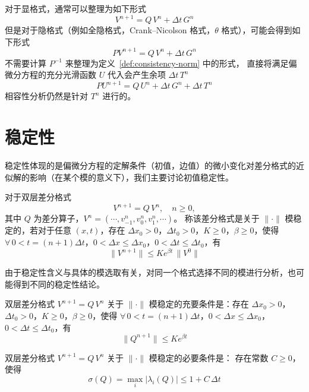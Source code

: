 \begin{remark}
    对于显格式，通常可以整理为如下形式
    \[
        V^{n+1} = Q \, V^{n} + \Delta t\, G^{n}
    \]
    但是对于隐格式（例如全隐格式，Crank–Nicolson 格式，$\theta$ 格式），可能会得到如下形式
    \[
        P V^{n+1} = Q \, V^{n} + \Delta t\, G^{n}
    \]
    不需要计算 $P^{-1}$ 来整理为定义~\ref{def:consistency-norm} 中的形式，
    直接将满足偏微分方程的充分光滑函数 $U$ 代入会产生余项 $\Delta t\,T^{n}$
    \[
        P U^{n+1} = Q \, U^{n} + \Delta t\, G^{n} + \Delta t\, T^{n}
    \]
    相容性分析仍然是针对 $T^{n}$ 进行的。
\end{remark}

\section{稳定性}

稳定性体现的是偏微分方程的定解条件（初值，边值）的微小变化对差分格式的近似解的影响（在某个模的意义下），我们主要讨论初值稳定性。

\begin{definition}[稳定性]
    对于双层差分格式
    \[
        V^{n+1} = Q \, V^n,\quad n \ge 0,
    \]
    其中 $Q$ 为差分算子，$V^n = (\cdots,v_{-1}^n,v_0^n,v_1^n,\cdots)$。
    称该差分格式是关于 $\| \cdot \|$ 模稳定的，若对于任意 $(x,t)$，存在 $\Delta x_0 >0$，$\Delta t_0 > 0$，$K \ge 0$，$\beta \ge 0$，使得
    $\forall\, 0 < t = (n+1)\Delta t$，$0 < \Delta x \le \Delta x_0$，$0 < \Delta t \le \Delta t_0$，有
    \[
        \| V^{n+1} \| \le K e^{\beta t}\,\| V^0 \|
    \]
\end{definition}

\begin{remark}
    由于稳定性含义与具体的模选取有关，对同一个格式选择不同的模进行分析，也可能得到不同的稳定性结论。
\end{remark}

\begin{theorem}
    双层差分格式 $V^{n+1} = Q \, V^n$ 关于 $\| \cdot \|$ 模稳定的充要条件是：存在 $\Delta x_0 >0$，$\Delta t_0 > 0$，$K \ge 0$，$\beta \ge 0$，使得
    $\forall\, 0 < t = (n+1)\Delta t$，$0 < \Delta x \le \Delta x_0$，$0 < \Delta t \le \Delta t_0$，有
    \[
        \| Q^{n+1} \| \le K e^{\beta t}
    \]
\end{theorem}

\begin{theorem}
    双层差分格式 $V^{n+1} = Q \, V^n$ 关于 $\|\cdot\|$ 模稳定的必要条件是：
    存在常数 $C \ge 0$，使得
    \[
        \sigma(Q) = \max_i|\lambda_i(Q)| \le 1 + C\,\Delta t
    \]
\end{theorem}

